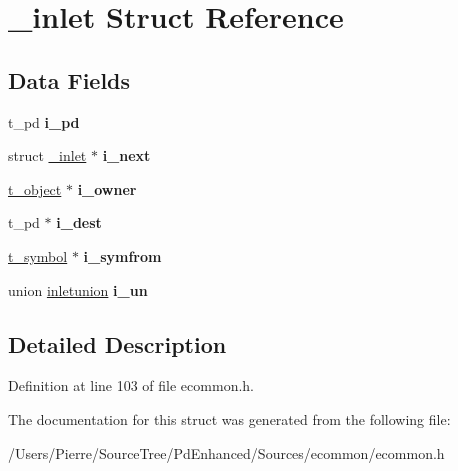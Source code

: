 \hypertarget{struct__inlet}{\section{\-\_\-inlet Struct Reference}
\label{struct__inlet}
}
\subsection*{Data Fields}
\begin{DoxyCompactItemize}
\item 
\hypertarget{struct__inlet_a2639bb3ac2a63922bf7393a675b28fd1}{t\-\_\-pd {\bfseries i\-\_\-pd}}\label{struct__inlet_a2639bb3ac2a63922bf7393a675b28fd1}

\item 
\hypertarget{struct__inlet_adb58549077d98b479e51d877e316ed31}{struct \hyperlink{struct__inlet}{\-\_\-inlet} $\ast$ {\bfseries i\-\_\-next}}\label{struct__inlet_adb58549077d98b479e51d877e316ed31}

\item 
\hypertarget{struct__inlet_aee881cb1182ca7632e843f9eb4503b30}{\hyperlink{struct__text}{t\-\_\-object} $\ast$ {\bfseries i\-\_\-owner}}\label{struct__inlet_aee881cb1182ca7632e843f9eb4503b30}

\item 
\hypertarget{struct__inlet_a7c16f89d729806fca332d345973b4231}{t\-\_\-pd $\ast$ {\bfseries i\-\_\-dest}}\label{struct__inlet_a7c16f89d729806fca332d345973b4231}

\item 
\hypertarget{struct__inlet_a534c2c39ea2fbb31ea35ce7eb60f8f43}{\hyperlink{struct__symbol}{t\-\_\-symbol} $\ast$ {\bfseries i\-\_\-symfrom}}\label{struct__inlet_a534c2c39ea2fbb31ea35ce7eb60f8f43}

\item 
\hypertarget{struct__inlet_a94954961ac07b15480857cece77f7065}{union \hyperlink{unioninletunion}{inletunion} {\bfseries i\-\_\-un}}\label{struct__inlet_a94954961ac07b15480857cece77f7065}

\end{DoxyCompactItemize}


\subsection{Detailed Description}


Definition at line 103 of file ecommon.\-h.



The documentation for this struct was generated from the following file\-:\begin{DoxyCompactItemize}
\item 
/\-Users/\-Pierre/\-Source\-Tree/\-Pd\-Enhanced/\-Sources/ecommon/ecommon.\-h\end{DoxyCompactItemize}
